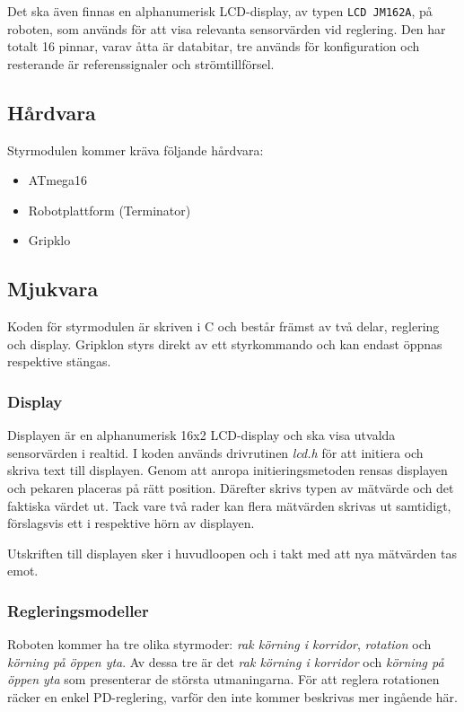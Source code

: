 \documentclass[11pt]{article}
\begin{document}
\begin{flushleft}
Det ska även finnas en alphanumerisk LCD-display, av typen \verb+LCD JM162A+, på roboten, som används för att visa relevanta sensorvärden vid reglering. Den har totalt 16 pinnar, varav åtta är databitar, tre används för konfiguration och resterande är referenssignaler och strömtillförsel.

\subsection{Hårdvara}
Styrmodulen kommer kräva följande hårdvara:
\begin{itemize}
	\item ATmega16
	\item Robotplattform (Terminator)
	\item Gripklo %
\end{itemize}

\subsection{Mjukvara}
Koden för styrmodulen är skriven i C och består främst av två delar, reglering och display. Gripklon styrs direkt av ett styrkommando och kan endast öppnas respektive stängas.


\subsubsection{Display}
Displayen är en alphanumerisk 16x2 LCD-display och ska visa utvalda sensorvärden i realtid. I koden används drivrutinen \emph{lcd.h} för att initiera och skriva text till displayen. Genom att anropa initieringsmetoden rensas displayen och pekaren placeras på rätt position. Därefter skrivs typen av mätvärde och det faktiska värdet ut. Tack vare två rader kan flera mätvärden skrivas ut samtidigt, förslagsvis ett i respektive hörn av displayen.

Utskriften till displayen sker i huvudloopen och i takt med att nya mätvärden tas emot.

\subsubsection{Regleringsmodeller} \label{mjukvarureglering}
Roboten kommer ha tre olika styrmoder: \textit{rak körning i korridor}, \textit{rotation} och \textit{körning på öppen yta}. Av dessa tre är det \textit{rak körning i korridor} och \textit{körning på öppen yta} som presenterar de största utmaningarna. För att reglera rotationen räcker en enkel PD-reglering, varför den inte kommer beskrivas mer ingående här. 


\end{flushleft}
\end{document}
